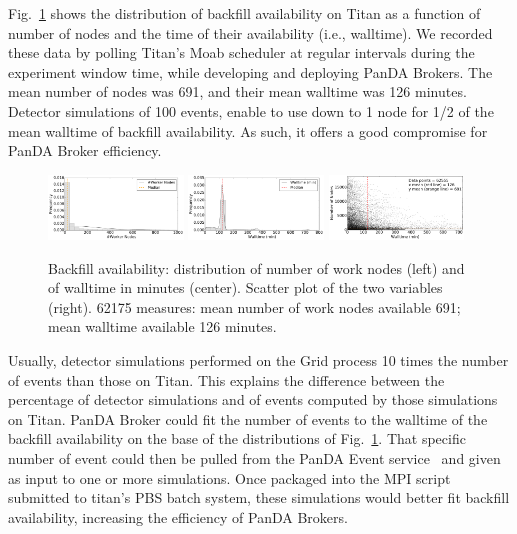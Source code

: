 Fig.~\ref{fig:backfill-distrib} shows the distribution of backfill
availability on Titan as a function of number of nodes and the time of their
availability (i.e., walltime). We recorded these data by polling Titan's Moab
scheduler at regular intervals during the experiment window time, while
developing and deploying PanDA Brokers. The mean number of nodes was 691, and
their mean walltime was 126 minutes. Detector simulations of 100 events, enable
to use down to 1 node for 1/2 of the mean walltime of backfill availability. As
such, it offers a good compromise for PanDA Broker efficiency.

\begin{figure}%
    \includegraphics[clip,width=0.32\textwidth]{figures/titan_backfill_wnodes_distribution.pdf}
    \includegraphics[clip,width=0.32\textwidth]{figures/titan_backfill_walltime_distribution.pdf}
    \includegraphics[clip,width=0.32\textwidth]{figures/titan_backfill_avail.png}

    \caption{Backfill availability: distribution of number of work nodes (left)
    and of walltime in minutes (center). Scatter plot of the two variables
    (right). 62175 measures: mean number of work nodes available 691; mean
    walltime available 126 minutes.}

\label{fig:backfill-distrib}
\end{figure}

Usually, detector simulations performed on the Grid process 10 times the number
of events than those on Titan. This explains the difference between the
percentage of detector simulations and of events computed by those simulations
on Titan. PanDA Broker could fit the number of events to the walltime of the
backfill availability on the base of the distributions of
Fig.~\ref{fig:backfill-distrib}. That specific number of event could then be
pulled from the PanDA Event service~\cite{calafiura2015atlas} and given as input
to one or more simulations. Once packaged into the MPI script submitted to
titan's PBS batch system, these simulations would better fit backfill
availability, increasing the efficiency of PanDA Brokers.

